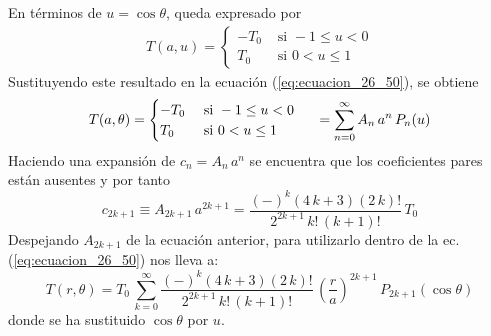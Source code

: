 En términos de $u = \cos \theta$, queda expresado por
\begin{align*}
T (a, u) = \begin{cases}
-T_{0} & \mbox{ si } -1 \leq u < 0 \\
T_{0} & \mbox{ si } 0 < u \leq 1
\end{cases}
\end{align*}
Sustituyendo este resultado en la ecuación (\ref{eq:ecuacion_26_50}), se obtiene
\begin{align*}
T (a, \theta) = \begin{cases}
- T_{0}  & \mbox{ si } -1 \leq u < 0 \\
T_{0} & \mbox{ si } 0 < u \leq 1 
\end{cases}
\hspace{0.5cm} = \sum_{n=0}^{\infty} A_{n} \, a^{n} \, P_{n}(u)
\label{eq:ecuacion_26_51}
\end{align*}
Haciendo una expansión de $c_{n} = A_{n} \, a^{n}$ se encuentra que los coeficientes pares están ausentes y por tanto
\[ c_{2k+1} \equiv A_{2k+1} \, a^{2k+1} = \dfrac{(-)^{k} (4 \, k + 3)(2 \, k)!}{2^{2k+1} \, k! \, (k+1)!} \, T_{0} \]
Despejando $A_{2k+1}$ de la ecuación anterior, para utilizarlo dentro de la ec. (\ref{eq:ecuacion_26_50}) nos lleva a:
\begin{equation}
T(r, \theta) = T_{0} \, \sum_{k=0}^{\infty} \dfrac{(-)^{k} (4 \, k + 3)(2 \, k)!}{2^{2k+1} \, k! \, (k+1)!} \, \left( \dfrac{r}{a} \right)^{2k+1} \, P_{2k+1} (\cos \theta)
\label{eq:ecuacion_26_52}
\end{equation}
donde se ha sustituido $\cos \theta$ por $u$.
